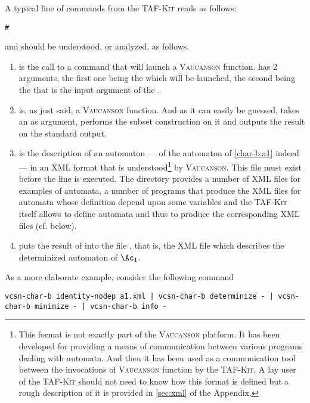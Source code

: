 \documentclass[a4paper]{report}
\newenvironment{shell}
{\begin{alltt}}
{\end{alltt}}
\newcommand{\taffn}[1]{\code{#1}}
\newcommand{\tafkit}{\textsc{TAF-Kit}\xspace}
\newcommand{\Vauc}{\textsc{Vaucanson}\xspace}
\begin{document}
A typical line of commands from the \tafkit reads as follows:
\begin{shell}
# 
\end{shell}
and should be understood, or analyzed, as follows.
\begin{enumerate}
\item {} is the call to a  command
  that will launch a \Vauc function.   has 2
  arguments, the first one being the  which will be
  launched, the second being the  that is the input
  argument of the .

\item \taffn{determinize} is, as just said, a \Vauc function.  And as
  it can easily be guessed, \taffn{determinize} takes an
   as argument, performs the subset construction on it
  and outputs the result on the standard output.

\item {} is the description of an automaton --- of the
  automaton of \autoref{char-b:a1} indeed --- in an XML format that is
  understood\footnote{%
    This format is not exactly part of the \Vauc platform.  It has
    been developed for providing a means of communication between
    various programs dealing with automata.  And then it has been used
    as a communication tool between the invocations of \Vauc function
    by the \tafkit.  A lay user of the \tafkit should not need to know
    how this format is defined
    but a rough description of it is provided in \autoref{sec:xml} of
    the Appendix.}
  by \Vauc. This file must exist before the line is executed.  The
   directory provides a number of XML files for
  examples of automata, a number of programs that produce the XML
  files for automata whose definition depend upon some variables and
  the \tafkit itself allows to define automata and thus to produce the
  corresponding XML files (cf. below).

\item {} puts the result of \taffn{determinize} into
  the file , that is, the XML file which describes the
  determinized automaton of $\Ac_{1}$.
\end{enumerate}

\bigskip

As a more elaborate example, consider the following command

\begin{verbatim}
vcsn-char-b identity-nodep a1.xml | vcsn-char-b determinize - | vcsn-char-b minimize - | vcsn-char-b info -
\end{verbatim}
\end{document}
